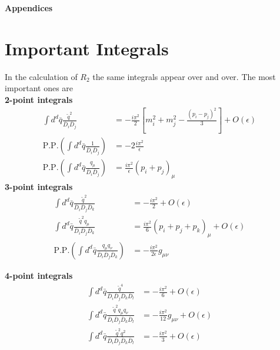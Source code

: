 \appendix
{\bf\Large Appendices} \\
\section{Important Integrals}
\label{app:Integrals}
In the calculation of $R_2$ the same integrals appear over and over. The most important ones are \cite{R2QCD} \\

{\bf 2-point integrals} \\
\begin{align}
\int  d^d \bar{q} \frac{\tilde{q}^2}{\bar{D}_i\bar{D}_j} & =  -\frac{i\pi^2}{2} \left[ m_i^2 + m_j^2 - \frac{\left( p_i - p_j \right)^2}{3} \right] + O(\epsilon) & \\
\mathrm{P.P.} \left( \int  d^d \bar{q} \frac{1}{\bar{D}_i\bar{D}_j} \right) & = -2\frac{i\pi^2}{\epsilon} & \\
\mathrm{P.P.} \left( \int  d^d \bar{q} \frac{q_{\mu}}{\bar{D}_i\bar{D}_j} \right) & =  \frac{i\pi^2}{\epsilon} \left( p_i + p_j \right)_{\mu} & 
\end{align}
{\bf 3-point integrals} \\
\begin{align}
\int  d^d \bar{q} \frac{\tilde{q}^2}{\bar{D}_i\bar{D}_j\bar{D}_k} & =  -\frac{i\pi^2}{2} + O(\epsilon) & \\
\int  d^d \bar{q} \frac{\tilde{q}^2q_{\mu}}{\bar{D}_i\bar{D}_j\bar{D}_k} & = \frac{i\pi^2}{6} \left( p_i + p_j + p_k \right)_{\mu} + O(\epsilon) & \\
\mathrm{P.P.} \left( \int  d^d \bar{q} \frac{q_{\mu}q_{\nu}}{\bar{D}_i\bar{D}_j\bar{D}_k} \right) & =  -\frac{i\pi^2}{2\epsilon} g_{\mu\nu} & 
\end{align}

{\bf 4-point integrals} \\
\begin{align}
\int  d^d \bar{q} \frac{\tilde{q}^4}{\bar{D}_i\bar{D}_j\bar{D}_k\bar{D}_l} & =  -\frac{i\pi^2}{6} + O(\epsilon) & \\
\int  d^d \bar{q} \frac{\tilde{q}^2q_{\mu}q_{\nu}}{\bar{D}_i\bar{D}_j\bar{D}_k\bar{D}_l} & =  -\frac{i\pi^2}{12} g_{\mu\nu} + O(\epsilon) & \\
\int  d^d \bar{q} \frac{\tilde{q}^2 q^2}{\bar{D}_i\bar{D}_j\bar{D}_k\bar{D}_l} & =  -\frac{i\pi^2}{3} + O(\epsilon) &  
\end{align}

